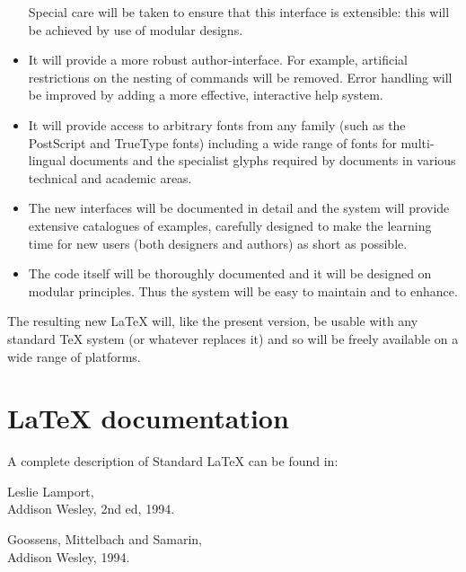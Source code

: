 \documentclass[a4paper]{article}
\newenvironment{citations}{%
   \list{}{%
      \renewcommand{\makelabel}[1]{\normalfont\itshape ##1}%
   }%
}{%
   \endlist
}
\newcommand{\AW}{Addison Wesley}
\newcommand{\PS}{{\sc Post\-Script}}
\begin{document}
\begin{itemize}
\begin{itemize}
 \end{itemize}

 Special care will be taken to ensure that this interface is
 extensible: this will be achieved by use of modular designs.
 
 
  \item
  It will provide a more robust author-interface. For example,
  artificial restrictions on the nesting of commands will be removed.
  Error handling will be improved by adding
  a more effective, interactive help system.
 
  \item
  It will provide access to arbitrary fonts from any family (such as
  the \PS{} and TrueType fonts) including a wide range of fonts for
  multi-lingual documents and the specialist glyphs required by
  documents in various technical and academic areas.

  \item
  The new interfaces will be documented in detail and the
  system will provide extensive catalogues of examples, carefully
  designed to make the learning time for new users (both designers and
  authors) as short as possible.
 
 \item
  The code itself will be thoroughly documented and it will be
  designed on modular principles.  Thus the system will be easy to
  maintain and to enhance.
\end{itemize}
 
The resulting new \LaTeX{} will, like the present version, be usable
with any standard \TeX{} system (or whatever replaces it) and so will
be freely available on a wide range of platforms.
  

\section{\LaTeX{} documentation}

\begingroup
\setlength{\parindent}{0pt}

A complete description of Standard \LaTeX{} can be found in:
\begin{citations}
\item[\LaTeX: A Document Preparation System]
   Leslie Lamport,\\ \AW, 2nd ed, 1994.
\item[The \LaTeX{} Companion]
   Goossens, Mittelbach and Samarin,\\ \AW, 1994.
\end{citations}
\end{document}

